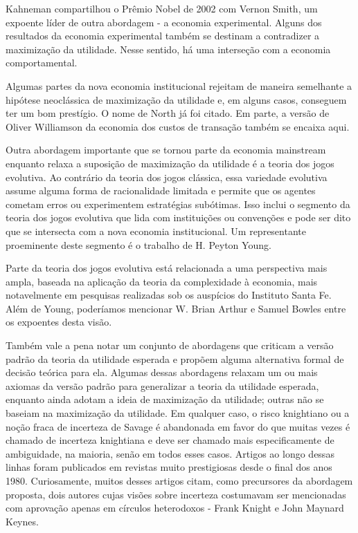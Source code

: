 \documentclass[12pt]{article}
\begin{document}
Kahneman compartilhou o Prêmio Nobel de 2002 com Vernon Smith, um expoente líder de outra abordagem - a economia experimental. Alguns dos resultados da economia experimental também se destinam a contradizer a maximização da utilidade. Nesse sentido, há uma interseção com a economia comportamental.

Algumas partes da nova economia institucional rejeitam de maneira semelhante a hipótese neoclássica de maximização da utilidade e, em alguns casos, conseguem ter um bom prestígio. O nome de North já foi citado. Em parte, a versão de Oliver Williamson da economia dos custos de transação também se encaixa aqui.

Outra abordagem importante que se tornou parte da economia mainstream enquanto relaxa a suposição de maximização da utilidade é a teoria dos jogos evolutiva. Ao contrário da teoria dos jogos clássica, essa variedade evolutiva assume alguma forma de racionalidade limitada e permite que os agentes cometam erros ou experimentem estratégias subótimas. Isso inclui o segmento da teoria dos jogos evolutiva que lida com instituições ou convenções e pode ser dito que se intersecta com a nova economia institucional. Um representante proeminente deste segmento é o trabalho de H. Peyton Young.

Parte da teoria dos jogos evolutiva está relacionada a uma perspectiva mais ampla, baseada na aplicação da teoria da complexidade à economia, mais notavelmente em pesquisas realizadas sob os auspícios do Instituto Santa Fe. Além de Young, poderíamos mencionar W. Brian Arthur e Samuel Bowles entre os expoentes desta visão.

Também vale a pena notar um conjunto de abordagens que criticam a versão padrão da teoria da utilidade esperada e propõem alguma alternativa formal de decisão teórica para ela. Algumas dessas abordagens relaxam um ou mais axiomas da versão padrão para generalizar a teoria da utilidade esperada, enquanto ainda adotam a ideia de maximização da utilidade; outras não se baseiam na maximização da utilidade. Em qualquer caso, o risco knightiano ou a noção fraca de incerteza de Savage é abandonada em favor do que muitas vezes é chamado de incerteza knightiana e deve ser chamado mais especificamente de ambiguidade, na maioria, senão em todos esses casos. Artigos ao longo dessas linhas foram publicados em revistas muito prestigiosas desde o final dos anos 1980. Curiosamente, muitos desses artigos citam, como precursores da abordagem proposta, dois autores cujas visões sobre incerteza costumavam ser mencionadas com aprovação apenas em círculos heterodoxos - Frank Knight e John Maynard Keynes.
\end{document}
